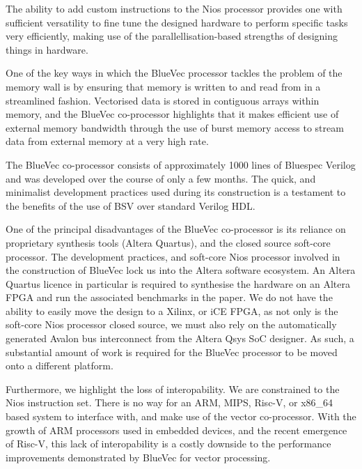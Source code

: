 \documentclass[a4paper,8pt]{report}
\begin{document}
The ability to add custom instructions to the Nios processor provides one with
sufficient versatility to fine tune the designed hardware to perform specific
tasks very efficiently, making use of the parallellisation-based strengths of
designing things in hardware.

One of the key ways in which the BlueVec processor tackles the problem of the
memory wall is by ensuring that memory is written to and read from in a
streamlined fashion. Vectorised data is stored in contiguous arrays within
memory, and the BlueVec co-processor highlights that it makes efficient use of
external memory bandwidth through the use of burst memory access to stream data
from external memory at a very high rate.



The BlueVec co-processor consists of approximately 1000 lines of Bluespec
Verilog and was developed over the course of only a few months. The quick, and
minimalist development practices used during its construction is a testament to
the benefits of the use of BSV over standard Verilog HDL.

One of the principal disadvantages of the BlueVec co-processor is its reliance
on proprietary synthesis tools (Altera Quartus), and the closed source soft-core
processor. The development practices, and soft-core Nios processor involved in
the construction of BlueVec lock us into the Altera software ecosystem. An
Altera Quartus licence in particular is required to synthesise the hardware on
an Altera FPGA and run the associated benchmarks in the paper. We do not have
the ability to easily move the design to a Xilinx, or iCE FPGA, as not only is
the soft-core Nios processor closed source, we must also rely on the
automatically generated Avalon bus interconnect from the Altera Qsys SoC
designer. As such, a substantial amount of work is required for the BlueVec
processor to be moved onto a different platform.


Furthermore, we highlight the loss of interopability. We are constrained to the
Nios instruction set. There is no way for an ARM, MIPS, Risc-V, or x86\_64 based
system to interface with, and make use of the vector co-processor. With the
growth of ARM processors used in embedded devices, and the recent emergence of
Risc-V, this lack of interopability is a costly downside to the performance
improvements demonstrated by BlueVec for vector processing.
\end{document}
